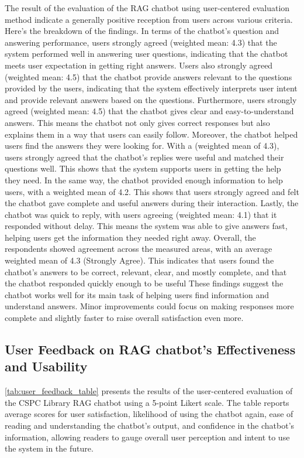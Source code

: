 \begin{refsection}
The result of the evaluation of the RAG chatbot using user-centered evaluation method indicate a generally positive reception from users across various criteria. Here’s the breakdown of the findings. In terms of the chatbot’s question and answering performance, users strongly agreed (weighted mean: 4.3) that the system performed well in answering user questions, indicating that the chatbot meets user expectation in getting right answers. Users also strongly agreed (weighted mean: 4.5) that the chatbot provide answers relevant to the questions provided by the users, indicating that the system effectively interprets user intent and provide relevant answers based on the questions. Furthermore, users strongly agreed (weighted mean: 4.5) that the chatbot gives clear and easy-to-understand answers. This means the chatbot not only gives correct responses but also explains them in a way that users can easily follow. Moreover, the chatbot helped users find the answers they were looking for. With a (weighted mean of 4.3), users strongly agreed that the chatbot’s replies were useful and matched their questions well. This shows that the system supports users in getting the help they need. In the same way, the chatbot provided enough information to help users, with a weighted mean of 4.2. This shows that users  strongly agreed and felt the chatbot gave complete and useful answers during their interaction. Lastly, the chatbot was quick to reply, with users agreeing (weighted mean: 4.1) that it responded without delay. This means the system was able to give answers fast, helping users get the information they needed right away. Overall, the respondents showed agreement across the measured areas, with an average weighted mean of 4.3 (Strongly Agree). This indicates that users found the chatbot’s answers to be correct, relevant, clear, and mostly complete, and that the chatbot responded quickly enough to be useful These findings suggest the chatbot works well for its main task of helping users find information and understand answers. Minor improvements could focus on making responses more complete and slightly faster to raise overall satisfaction even more.

\subsection{User Feedback on RAG chatbot’s Effectiveness and Usability}
\ref{tab:user_feedback_table} presents the results of the user-centered evaluation of the CSPC Library RAG chatbot using a 5-point Likert scale. The table reports average scores for user satisfaction, likelihood of using the chatbot again, ease of reading and understanding the chatbot’s output, and confidence in the chatbot’s information, allowing readers to gauge overall user perception and intent to use the system in the future.


\end{refsection}
